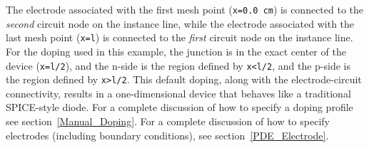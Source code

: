 The electrode associated with the first mesh point (\texttt{x=0.0 cm}) 
is connected to the \emph{second} circuit node on the instance line, 
while the electrode associated with the last mesh point (\texttt{x=l}) 
is connected to the \emph{first} circuit node on the instance line.  
For the doping used in this example, the junction is in the exact 
center of the device (\texttt{x=l/2}), and the n-side
is the region defined by \texttt{x<l/2}, and the p-side is the region defined by
\texttt{x>l/2}.  This default doping, along with the electrode-circuit connectivity,
results in a one-dimensional device that behaves like a traditional
SPICE-style diode.  For a complete discussion of how to specify
a doping profile see section~\ref{Manual_Doping}.  For a complete discussion
of how to specify electrodes (including boundary conditions), see
section~\ref{PDE_Electrode}.

